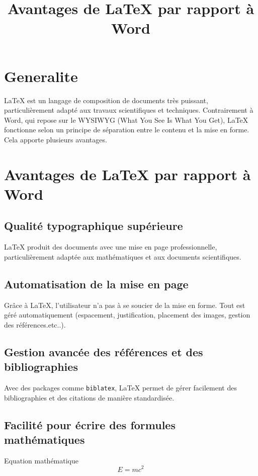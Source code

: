 \documentclass[a4paper,12pt]{article} %
\begin{document}
\title{Avantages de \LaTeX{} par rapport à Word}
\maketitle %

\section{Generalite} %
\LaTeX{} est un langage de composition de documents très puissant, 
particulièrement adapté aux travaux scientifiques et techniques. 
Contrairement à Word, qui repose sur le WYSIWYG (What You See Is What You Get), 
\LaTeX{} fonctionne selon un principe de séparation entre le contenu et la mise en forme. 
Cela apporte plusieurs avantages.

\section{Avantages de \LaTeX{} par rapport à Word}

\subsection{Qualité typographique supérieure} %
\LaTeX{} produit des documents avec une mise en page professionnelle, 
particulièrement adaptée aux mathématiques et aux documents scientifiques.

\subsection{Automatisation de la mise en page}
Grâce à \LaTeX{}, l’utilisateur n’a pas à se soucier de la mise en forme. 
Tout est géré automatiquement (espacement, justification, placement des images, gestion des références.etc..).

\subsection{Gestion avancée des références et des bibliographies}
Avec des packages comme \texttt{biblatex}, \LaTeX{} permet de gérer facilement 
des bibliographies et des citations de manière standardisée.

\subsection{Facilité pour écrire des formules mathématiques}
Equation mathématique
\begin{equation}
    E = mc^2
\end{equation}
\end{document}
